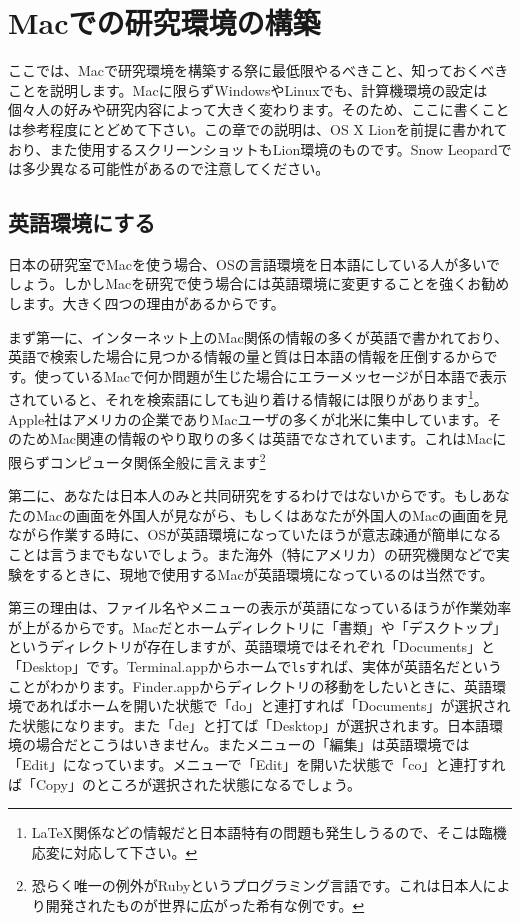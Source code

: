 \setcounter{chapter}{0}
\renewcommand{\thechapter}{\Alph{chapter}}
\setcounter{equation}{0}
\renewcommand{\theequation}{\Alph{chapter}.\arabic{equation}}
\setcounter{figure}{0}
\renewcommand{\thefigure}{\Alph{chapter}.\arabic{figure}}
\setcounter{table}{0}
\renewcommand{\thetable}{\Alph{chapter}.\arabic{table}}
\appendix
\chapter{Macでの研究環境の構築}
ここでは、Macで研究環境を構築する祭に最低限やるべきこと、知っておくべきことを説明します。Macに限らずWindowsやLinuxでも、計算機環境の設定は個々人の好みや研究内容によって大きく変わります。そのため、ここに書くことは参考程度にとどめて下さい。この章での説明は、OS X Lionを前提に書かれており、また使用するスクリーンショットもLion環境のものです。Snow Leopardでは多少異なる可能性があるので注意してください。
\section{英語環境にする}
日本の研究室でMacを使う場合、OSの言語環境を日本語にしている人が多いでしょう。しかしMacを研究で使う場合には英語環境に変更することを強くお勧めします。大きく四つの理由があるからです。

まず第一に、インターネット上のMac関係の情報の多くが英語で書かれており、英語で検索した場合に見つかる情報の量と質は日本語の情報を圧倒するからです。使っているMacで何か問題が生じた場合にエラーメッセージが日本語で表示されていると、それを検索語にしても辿り着ける情報には限りがあります\footnote{\LaTeX 関係などの情報だと日本語特有の問題も発生しうるので、そこは臨機応変に対応して下さい。}。Apple社はアメリカの企業でありMacユーザの多くが北米に集中しています。そのためMac関連の情報のやり取りの多くは英語でなされています。これはMacに限らずコンピュータ関係全般に言えます\footnote{恐らく唯一の例外がRubyというプログラミング言語です。これは日本人により開発されたものが世界に広がった希有な例です。}

第二に、あなたは日本人のみと共同研究をするわけではないからです。もしあなたのMacの画面を外国人が見ながら、もしくはあなたが外国人のMacの画面を見ながら作業する時に、OSが英語環境になっていたほうが意志疎通が簡単になることは言うまでもないでしょう。また海外（特にアメリカ）の研究機関などで実験をするときに、現地で使用するMacが英語環境になっているのは当然です。

第三の理由は、ファイル名やメニューの表示が英語になっているほうが作業効率が上がるからです。Macだとホームディレクトリに「書類」や「デスクトップ」というディレクトリが存在しますが、英語環境ではそれぞれ「Documents」と「Desktop」です。Terminal.appからホームで\texttt{ls}すれば、実体が英語名だということがわかります。Finder.appからディレクトリの移動をしたいときに、英語環境であればホームを開いた状態で「do」と連打すれば「Documents」が選択された状態になります。また「de」と打てば「Desktop」が選択されます。日本語環境の場合だとこうはいきません。またメニューの「編集」は英語環境では「Edit」になっています。メニューで「Edit」を開いた状態で「co」と連打すれば「Copy」のところが選択された状態になるでしょう。

